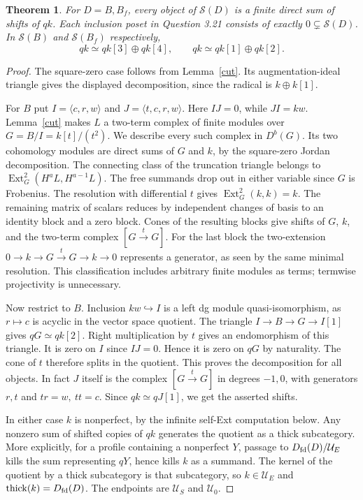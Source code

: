 \documentclass[11pt]{article}
\newtheorem{thm}{Theorem}
\newcommand{\Dfd}{D_{\rm fd}}
\newcommand{\thick}{\operatorname{thick}}
\newcommand{\Ext}{\operatorname{Ext}}
\newcommand{\sg}{\mathcal S}
\newcommand{\UU}{\mathcal U}
\begin{document}
\begin{thm}\label{one}
For $D=B,B_f$, every object of $\sg(D)$ is a finite direct sum of shifts
of $qk$. Each inclusion poset in Question 3.21 consists of exactly
$0\subsetneq\sg(D)$. In $\sg(B)$ and $\sg(B_f)$ respectively,
\[
            qk\simeq qk[3]\oplus qk[4],
  \qquad    qk\simeq qk[1]\oplus qk[2].
\]
\end{thm}
\begin{proof}
The square-zero case follows from Lemma~\ref{cut}. Its augmentation-ideal
triangle gives the displayed decomposition, since the radical is
$k\oplus k[1]$.

For $B$ put $I=\langle c,r,w\rangle$ and $J=\langle t,c,r,w\rangle$.
Here $IJ=0$, while $JI=kw$. Lemma~\ref{cut} makes $L$ a two-term
complex of finite modules over $G=B/I=k[t]/(t^2)$. We describe every
such complex in $D^b(G)$. Its two cohomology modules are direct sums
of $G$ and $k$, by the square-zero Jordan decomposition. The connecting
class of the truncation triangle belongs to $\Ext_G^2(H^aL,H^{a-1}L)$.
The free summands drop out in either variable since $G$ is Frobenius.
The resolution with differential $t$ gives $\Ext_G^2(k,k)=k$.
The remaining matrix of scalars reduces by independent changes of basis
to an identity block and a zero block. Cones of the resulting blocks
give shifts of $G$, $k$, and the two-term complex $[G\xrightarrow{t}G]$.
For the last block the two-extension
$0\to k\to G\xrightarrow{t}G\to k\to0$ represents a generator, as
seen by the same minimal resolution. This classification includes
arbitrary finite modules as terms; termwise projectivity is unnecessary.

Now restrict to $B$. Inclusion $kw\hookrightarrow I$ is a left dg
module quasi-isomorphism, as $r\mapsto c$ is acyclic in the vector
space quotient. The triangle $I\to B\to G\to I[1]$ gives $qG\simeq qk[2]$.
Right multiplication by $t$ gives an endomorphism of this triangle.
It is zero on $I$ since $IJ=0$. Hence it is zero on $qG$ by naturality.
The cone of $t$ therefore splits in the quotient. This proves the
decomposition for all objects. In fact $J$ itself is the complex
$[G\xrightarrow{t}G]$ in degrees $-1,0$, with generators $r,t$ and
$t r=w,\ t t=c$. Since $qk\simeq qJ[1]$, we get the asserted shifts.

In either case $k$ is nonperfect, by the infinite self-Ext computation
below. Any nonzero sum of shifted copies of $qk$ generates the quotient
as a thick subcategory. More explicitly, for a profile containing a
nonperfect $Y$, passage to $\Dfd(D)/\UU_E$ kills the sum representing
$qY$, hence kills $k$ as a summand. The kernel of the quotient by a
thick subcategory is that subcategory, so $k\in\UU_E$ and $\thick(k)=
\Dfd(D)$. The endpoints are $\UU_S$ and $\UU_0$.
\end{proof}
\end{document}
